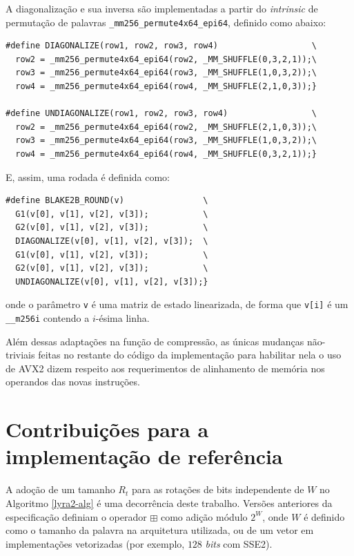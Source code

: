 \documentclass{article}
\begin{document}
A diagonalização e sua inversa são implementadas a partir do \emph{intrinsic}
de permutação de palavras \texttt{\_mm256\_permute4x64\_epi64}, definido como abaixo:

\begin{small}
\begin{verbatim}
#define DIAGONALIZE(row1, row2, row3, row4)                   \
  row2 = _mm256_permute4x64_epi64(row2, _MM_SHUFFLE(0,3,2,1));\
  row3 = _mm256_permute4x64_epi64(row3, _MM_SHUFFLE(1,0,3,2));\
  row4 = _mm256_permute4x64_epi64(row4, _MM_SHUFFLE(2,1,0,3));}

#define UNDIAGONALIZE(row1, row2, row3, row4)                 \
  row2 = _mm256_permute4x64_epi64(row2, _MM_SHUFFLE(2,1,0,3));\
  row3 = _mm256_permute4x64_epi64(row3, _MM_SHUFFLE(1,0,3,2));\
  row4 = _mm256_permute4x64_epi64(row4, _MM_SHUFFLE(0,3,2,1));}
\end{verbatim}
\end{small}

E, assim, uma rodada é definida como:

\begin{small}
\begin{verbatim}
#define BLAKE2B_ROUND(v)                \
  G1(v[0], v[1], v[2], v[3]);           \
  G2(v[0], v[1], v[2], v[3]);           \
  DIAGONALIZE(v[0], v[1], v[2], v[3]);  \
  G1(v[0], v[1], v[2], v[3]);           \
  G2(v[0], v[1], v[2], v[3]);           \
  UNDIAGONALIZE(v[0], v[1], v[2], v[3]);}
\end{verbatim}
\end{small}
onde o parâmetro \texttt{v} é uma matriz de estado linearizada, de forma
que \texttt{v[i]} é um \texttt{\_\_m256i} contendo a $i$-ésima linha.

Além dessas adaptações na função de compressão, as únicas mudanças
não-triviais feitas no restante do código da implementação para
habilitar nela o uso de AVX2 dizem respeito aos requerimentos de
alinhamento de memória nos operandos das novas instruções.

\section{Contribuições para a implementação de referência }
\label{sec-contribuicoes}

A adoção de um tamanho $R_{t}$ para as rotações de bits independente de $W$ no
Algoritmo \ref{lyra2-alg} é uma decorrência deste trabalho. Versões anteriores
da especificação definiam o operador $\boxplus$ como adição módulo $2^{W}$,
onde $W$ é definido como o tamanho da palavra na arquitetura utilizada, ou de
um vetor em implementações vetorizadas (por exemplo, $128$ \emph{bits} com SSE2).
\end{document}
